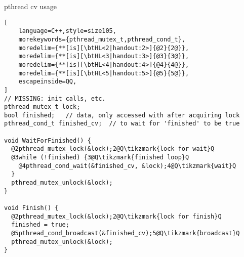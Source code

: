 \begin{frame}[fragile,label=finishedExample]{pthread cv usage}
\begin{lstlisting}[
    language=C++,style=size105,
    morekeywords={pthread_mutex_t,pthread_cond_t},
    moredelim={**[is][\btHL<2|handout:2>]{@2}{2@}}, 
    moredelim={**[is][\btHL<3|handout:3>]{@3}{3@}}, 
    moredelim={**[is][\btHL<4|handout:4>]{@4}{4@}}, 
    moredelim={**[is][\btHL<5|handout:5>]{@5}{5@}}, 
    escapeinside=QQ,
]
// MISSING: init calls, etc.
pthread_mutex_t lock;
bool finished;   // data, only accessed with after acquiring lock
pthread_cond_t finished_cv;  // to wait for 'finished' to be true

void WaitForFinished() {
  @2pthread_mutex_lock(&lock);2@Q\tikzmark{lock for wait}Q
  @3while (!finished) {3@Q\tikzmark{finished loop}Q
    @4pthread_cond_wait(&finished_cv, &lock);4@Q\tikzmark{wait}Q
  }
  pthread_mutex_unlock(&lock);
}

void Finish() {
  @2pthread_mutex_lock(&lock);2@Q\tikzmark{lock for finish}Q
  finished = true;
  @5pthread_cond_broadcast(&finished_cv);5@Q\tikzmark{broadcast}Q
  pthread_mutex_unlock(&lock);
}
\end{lstlisting}
\end{frame}
